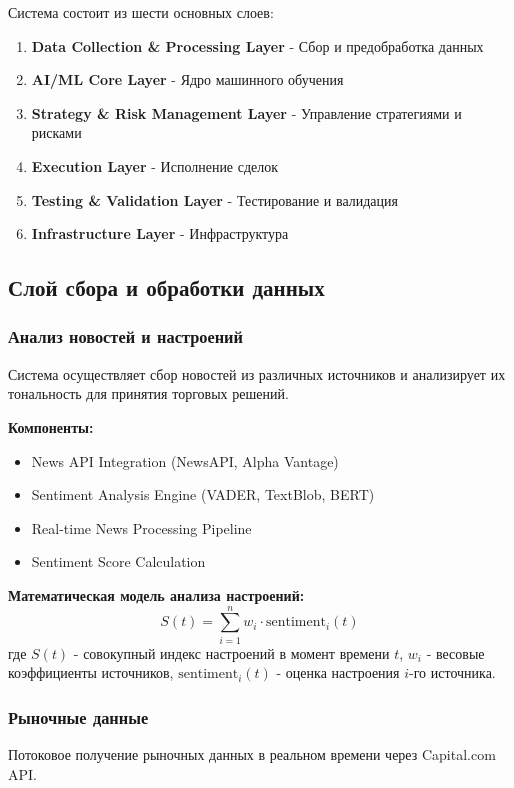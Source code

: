 \documentclass[12pt,a4paper]{article}
\begin{document}
Система состоит из шести основных слоев:

\begin{enumerate}
    \item \textbf{Data Collection \& Processing Layer} - Сбор и предобработка данных
    \item \textbf{AI/ML Core Layer} - Ядро машинного обучения
    \item \textbf{Strategy \& Risk Management Layer} - Управление стратегиями и рисками
    \item \textbf{Execution Layer} - Исполнение сделок
    \item \textbf{Testing \& Validation Layer} - Тестирование и валидация
    \item \textbf{Infrastructure Layer} - Инфраструктура
\end{enumerate}

\subsection{Слой сбора и обработки данных}

\subsubsection{Анализ новостей и настроений}
Система осуществляет сбор новостей из различных источников и анализирует их тональность для принятия торговых решений.

\textbf{Компоненты:}
\begin{itemize}
    \item News API Integration (NewsAPI, Alpha Vantage)
    \item Sentiment Analysis Engine (VADER, TextBlob, BERT)
    \item Real-time News Processing Pipeline
    \item Sentiment Score Calculation
\end{itemize}

\textbf{Математическая модель анализа настроений:}
\begin{equation}
S(t) = \sum_{i=1}^{n} w_i \cdot \text{sentiment}_i(t)
\end{equation}
где $S(t)$ - совокупный индекс настроений в момент времени $t$, $w_i$ - весовые коэффициенты источников, $\text{sentiment}_i(t)$ - оценка настроения $i$-го источника.

\subsubsection{Рыночные данные}
Потоковое получение рыночных данных в реальном времени через Capital.com API.
\end{document}
